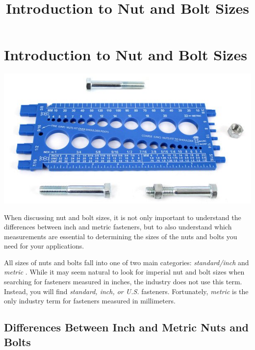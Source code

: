 \documentclass[english,]{article}
\title{Introduction to Nut and Bolt Sizes}
\date{}
\begin{document}
\maketitle


\hypertarget{introduction-to-nut-and-bolt-sizes}{%
\section{\texorpdfstring{{Introduction to Nut and Bolt
Sizes}}{Introduction to Nut and Bolt Sizes}}\label{introduction-to-nut-and-bolt-sizes}}

\hypertarget{isolation-scope-ifxaekaopxrq6yt1cpor23715}{}

\hypertarget{idgbn}{}
\hypertarget{iz9k}{}
\includegraphics{Introduction to Nut and Bolt Sizes_files/62ffc530cd49d888286820.jpg}

\hypertarget{ikxe}{}
When discussing nut and bolt sizes, it is not only important to
understand the differences between inch and metric fasteners, but to
also understand which measurements are essential to determining the
sizes of the nuts and bolts you need for your applications.

\hypertarget{iov0gj}{}
All sizes of nuts and bolts fall into one of two main categories:
\emph{standard/inch} and \emph{metric} . While it may seem natural to
look for imperial nut and bolt sizes when searching for fasteners
measured in inches, the industry does not use this term. Instead, you
will find \emph{standard, inch, or U.S.} fasteners. Fortunately,
\emph{metric} is the only industry term for fasteners measured in
millimeters.

\hypertarget{ivhqvk}{%
\subsection{Differences Between Inch and Metric Nuts and
Bolts}\label{ivhqvk}}
\end{document}
